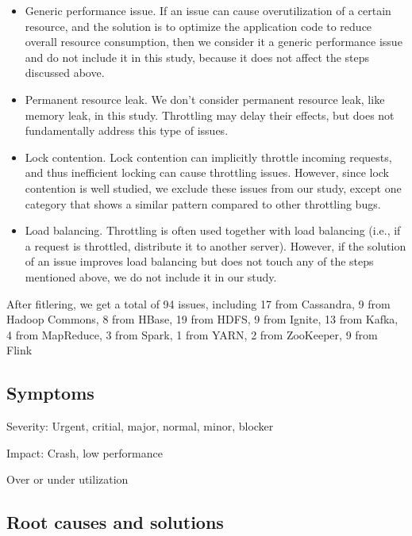 \begin{itemize}

\item Generic performance issue. If an issue can cause overutilization of a certain resource, and the solution is to
optimize the application code to reduce overall resource consumption, then we consider it a generic performance issue
and do not include it in this study, because it does not affect the steps discussed above.

\item Permanent resource leak. We don't consider permanent resource leak, like memory leak, in this study. Throttling
may delay their effects, but does not fundamentally address this type of issues.

\item Lock contention. Lock contention can implicitly throttle incoming requests, and thus inefficient locking can cause throttling
issues. However, since lock contention is well studied, we exclude these issues from our study, except one category that
shows a similar pattern compared to other throttling bugs.

\item Load balancing. Throttling is often used together with load balancing (i.e., if a request is throttled, distribute it to
another server). However, if the solution of an issue improves load balancing but does not touch any of the steps
mentioned above, we do not include it in our study.

\end{itemize}

After fitlering, we get a total of 94 issues, including 17 from Cassandra, 9 from Hadoop Commons, 8 from HBase, 19 from HDFS, 9 from Ignite, 13 from Kafka, 
4 from MapReduce, 3 from Spark, 1 from YARN, 2 from ZooKeeper, 9 from Flink

\subsection{Symptoms}

Severity: Urgent, critial, major, normal, minor, blocker

Impact: Crash, low performance

Over or under utilization

\subsection{Root causes and solutions}

